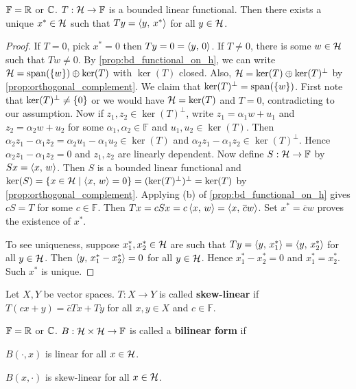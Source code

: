 \begin{theorem}
    $\mathbb{F} = \mathbb{R}$ or $\mathbb{C}$. $T:\mathcal{H}\to\mathbb{F}$ is a bounded linear 
    functional. Then there exists a unique $x^*\in\mathcal{H}$ such that 
    $Ty = \left\langle {y},\, {x^*} \right\rangle$ for all $y\in\mathcal{H}$.
\end{theorem}
\begin{proof}
    If $T = 0$, pick $x^* = 0$ then $Ty = 0 = \left\langle {y},\, {0} \right\rangle$. If $T\neq 0$, 
    there is some $w\in\mathcal{H}$ such that $Tw\neq 0$. By 
    \cref{prop:bd_functional_on_h}, we can write $\mathcal{H} = \operatorname{span}(\left\{ {w} \right\})\oplus\ker(T)$ 
    with $\ker(T)$ closed. Also, $\mathcal{H} = \ker(T)\oplus\ker(T)^{\perp}$ by 
    \cref{prop:orthogonal_complement}. We claim that $\ker(T)^{\perp} = \operatorname{span}(\left\{ {w} \right\})$. 
    First note that $\ker(T)^{\perp}\neq \left\{ {0} \right\}$ or we would have 
    $\mathcal{H} = \ker(T)$ and $T = 0$, contradicting to our assumption. Now if 
    $z_1,z_2\in\ker(T)^\perp$, write $z_1 = \alpha_1 w + u_1$ and 
    $z_2 = \alpha_2 w + u_2$ for some $\alpha_1,\alpha_2\in\mathbb{F}$ and 
    $u_1,u_2\in\ker(T)$. Then $\alpha_2z_1 - \alpha_1z_2 
    = \alpha_2u_1 - \alpha_1u_2\in\ker(T)$ and $\alpha_2z_1 - \alpha_1z_2
    \in\ker(T)^\perp$. Hence $\alpha_2z_1 - \alpha_1z_2 = 0$ and $z_1,z_2$ 
    are linearly dependent. Now define $S:\mathcal{H}\to\mathbb{F}$ by $Sx = \left\langle {x},\, {w} \right\rangle$. 
    Then $S$ is a bounded linear functional and $\ker(S) = \left\{ x\in\mathcal{H} \;\middle\vert\; \left\langle {x},\, {w} \right\rangle = 0 \right\} 
    = (\ker(T)^\perp)^\perp = \ker(T)$ by \cref{prop:orthogonal_complement}. 
    Applying (b) of \cref{prop:bd_functional_on_h} gives $cS = T$ for some 
    $c\in\mathbb{F}$. Then $Tx = cSx = c\left\langle {x},\, {w} \right\rangle = \left\langle {x},\, {\overline{c}w} \right\rangle$. 
    Set $x^* = \overline{c}w$ proves the existence of $x^*$. 

    To see uniqueness, suppose $x_1^*,x_2^*\in\mathcal{H}$ are such that 
    $Ty = \left\langle {y},\, {x_1^*} \right\rangle = \left\langle {y},\, {x_2^*} \right\rangle$ for all $y\in\mathcal{H}$. Then 
    $\left\langle {y},\, {x_1^* - x_2^*} \right\rangle = 0$ for all $y\in\mathcal{H}$. Hence 
    $x_1^* - x_2^* = 0$ and $x_1^* = x_2^*$. Such $x^*$ is unique.
\end{proof}

\begin{definition}
    Let $X,Y$ be vector spaces. $T:X\to Y$ is called \textbf{skew-linear} if 
    $T(cx + y) = \overline{c}Tx + Ty$ for all $x,y\in X$ and $c\in\mathbb{F}$.
\end{definition}

\begin{definition}
    $\mathbb{F} = \mathbb{R}$ or $\mathbb{C}$. $B:\mathcal{H}\times\mathcal{H}\to\mathbb{F}$ is called a 
    \textbf{bilinear form} if 
    \begin{thmenum}
        \item $B(\cdot,x)$ is linear for all $x\in\mathcal{H}$. 
        \item $B(x,\cdot)$ is skew-linear for all $x\in\mathcal{H}$.
    \end{thmenum}
\end{definition}

